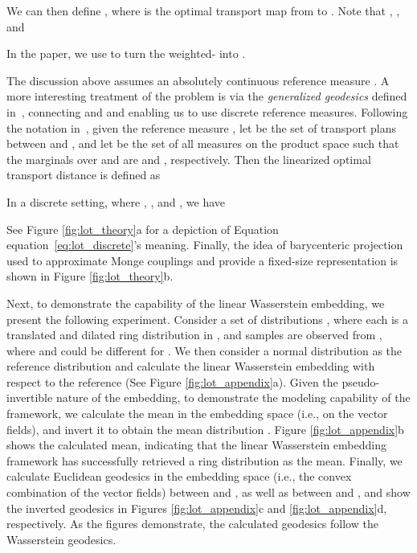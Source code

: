 \documentclass[table]{article} \usepackage{iclr2021_conference,times}
\def\eqref#1{equation~\ref{#1}}
\begin{document}
We can then define , where  is the optimal transport map from  to . Note that , , and
\vspace{-0.07in}

In the paper, we use  to turn the weighted- into .

The discussion above assumes an absolutely continuous reference measure . A more interesting treatment of the problem is via the \emph{generalized geodesics} defined in~\citep{ambrosio2008gradient}, connecting  and  and enabling us to use discrete reference measures. Following the notation in~\citep{ambrosio2008gradient}, given the reference measure , let  be the set of transport plans between  and , and let  be the set of all measures on the product space  such that the marginals over  and  are  and , respectively. Then the linearized optimal transport distance is defined as
\vspace{-.07in}

In a discrete setting, where , , and , we have
\vspace{-.03in}

See Figure \ref{fig:lot_theory}a for a depiction of Equation \eqref{eq:lot_discrete}'s meaning. Finally, the idea of barycenteric projection used to approximate Monge couplings and provide a fixed-size representation is shown in Figure \ref{fig:lot_theory}b.

Next, to demonstrate the capability of the linear Wasserstein embedding, we present the following experiment. Consider a set of distributions , where each  is a translated and dilated ring distribution in , and  samples are observed from , where  and  could be different for . We then consider a normal distribution as the reference distribution and calculate the linear Wasserstein embedding with respect to the reference (See Figure \ref{fig:lot_appendix}a). Given the pseudo-invertible nature of the embedding, to demonstrate the modeling capability of the framework, we calculate the mean in the embedding space (i.e., on the vector fields), and invert it to obtain the mean distribution . Figure \ref{fig:lot_appendix}b shows the calculated mean, indicating that the linear Wasserstein embedding framework has successfully retrieved a ring distribution as the mean. Finally, we calculate Euclidean geodesics in the embedding space (i.e., the convex combination of the vector fields) between  and , as well as between  and , and show the inverted geodesics in Figures \ref{fig:lot_appendix}c and \ref{fig:lot_appendix}d, respectively. As the figures demonstrate, the calculated geodesics follow the Wasserstein geodesics.
\end{document}
